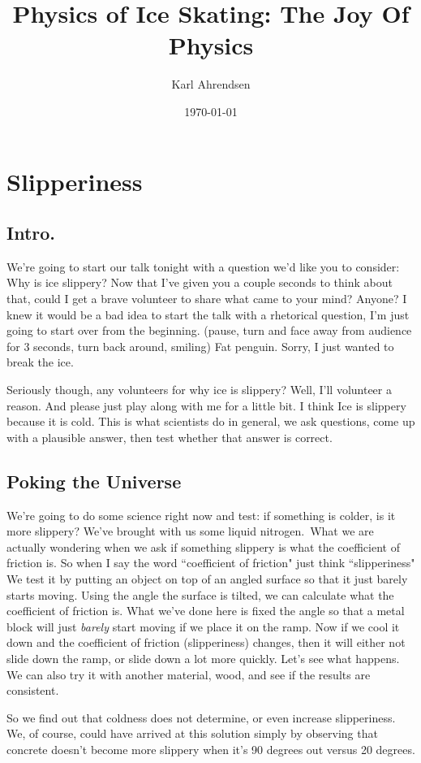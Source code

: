 \documentclass[12pt]{article}
\title{Physics of Ice Skating: The Joy Of Physics}
\author{Karl Ahrendsen}
\date{\today}
\begin{document}
\maketitle
\section{Slipperiness}
\subsection{Intro.}
We're going to start our talk tonight with a question we'd like you to consider:
Why is ice slippery? Now that I've given you a couple seconds to think about that, 
could I get a brave volunteer to share what came to your mind? Anyone? I knew it would
be a bad idea to start the talk with a rhetorical question, I'm just going to start 
over from the beginning. (pause, turn and face away from audience for 3 seconds, 
turn back around, smiling) Fat penguin. Sorry, I just wanted to break the ice. 
    
Seriously
though, any volunteers for why ice is slippery? Well, I'll volunteer a reason. And please 
just play along with me for a little bit. I think Ice is slippery because it is cold.
This is what scientists do in general, we ask questions, come up with a plausible answer, 
then test whether that answer is correct. 

\subsection{Poking the Universe}
We're going to do some science right now 
and test: if something is colder, is it more slippery? We've brought with us some 
liquid nitrogen. What we are actually wondering when we ask if something slippery
is what the coefficient of friction is. So when I say the word ``coefficient of
friction" just think ``slipperiness" We test it by putting an object on
top of an angled surface so that it just barely starts moving. Using the angle 
the surface is tilted, we can calculate what the coefficient of friction is. 
What we've done here is fixed the angle so that a metal block will just \emph{barely}
start moving if we place it on the ramp. Now if we cool it down and the coefficient
of friction (slipperiness) changes, then it will either not slide down the ramp, or
slide down a lot more quickly. Let's see what happens. 
We can also try it with another material, wood, and see if the results are 
consistent. 

So we find out that coldness does not determine, or even increase slipperiness.
We, of course, could have arrived at this solution simply by observing that
concrete doesn't become more slippery when it's 90 degrees out versus 20 degrees. 
\end{document}
